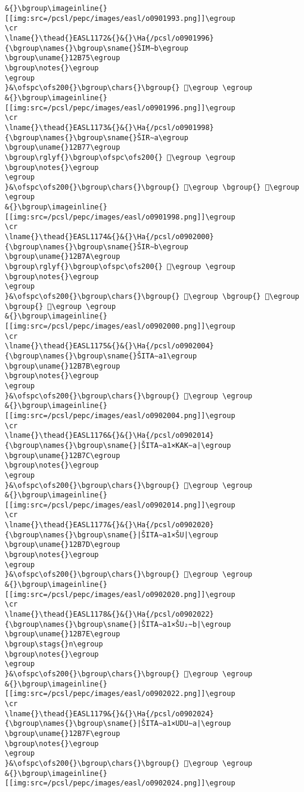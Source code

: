 \begin{verbatim}
&{}\bgroup\imageinline{}[[img:src=/pcsl/pepc/images/easl/o0901993.png]]\egroup
\cr
\lname{}\thead{}EASL1172&{}&{}\Ha{/pcsl/o0901996}{\bgroup\names{}\bgroup\sname{}ŠIM∼b\egroup
\bgroup\uname{}12B75\egroup
\bgroup\notes{}\egroup
\egroup
}&\ofspc\ofs200{}\bgroup\chars{}\bgroup{} 𒭵\egroup \egroup
&{}\bgroup\imageinline{}[[img:src=/pcsl/pepc/images/easl/o0901996.png]]\egroup
\cr
\lname{}\thead{}EASL1173&{}&{}\Ha{/pcsl/o0901998}{\bgroup\names{}\bgroup\sname{}ŠIR∼a\egroup
\bgroup\uname{}12B77\egroup
\bgroup\rglyf{}\bgroup\ofspc\ofs200{} 𒭷\egroup \egroup
\bgroup\notes{}\egroup
\egroup
}&\ofspc\ofs200{}\bgroup\chars{}\bgroup{} 𒭶\egroup \bgroup{} 𒭷\egroup \egroup
&{}\bgroup\imageinline{}[[img:src=/pcsl/pepc/images/easl/o0901998.png]]\egroup
\cr
\lname{}\thead{}EASL1174&{}&{}\Ha{/pcsl/o0902000}{\bgroup\names{}\bgroup\sname{}ŠIR∼b\egroup
\bgroup\uname{}12B7A\egroup
\bgroup\rglyf{}\bgroup\ofspc\ofs200{} 𒭺\egroup \egroup
\bgroup\notes{}\egroup
\egroup
}&\ofspc\ofs200{}\bgroup\chars{}\bgroup{} 𒭸\egroup \bgroup{} 𒭹\egroup \bgroup{} 𒭺\egroup \egroup
&{}\bgroup\imageinline{}[[img:src=/pcsl/pepc/images/easl/o0902000.png]]\egroup
\cr
\lname{}\thead{}EASL1175&{}&{}\Ha{/pcsl/o0902004}{\bgroup\names{}\bgroup\sname{}ŠITA∼a1\egroup
\bgroup\uname{}12B7B\egroup
\bgroup\notes{}\egroup
\egroup
}&\ofspc\ofs200{}\bgroup\chars{}\bgroup{} 𒭻\egroup \egroup
&{}\bgroup\imageinline{}[[img:src=/pcsl/pepc/images/easl/o0902004.png]]\egroup
\cr
\lname{}\thead{}EASL1176&{}&{}\Ha{/pcsl/o0902014}{\bgroup\names{}\bgroup\sname{}|ŠITA∼a1×KAK∼a|\egroup
\bgroup\uname{}12B7C\egroup
\bgroup\notes{}\egroup
\egroup
}&\ofspc\ofs200{}\bgroup\chars{}\bgroup{} 𒭼\egroup \egroup
&{}\bgroup\imageinline{}[[img:src=/pcsl/pepc/images/easl/o0902014.png]]\egroup
\cr
\lname{}\thead{}EASL1177&{}&{}\Ha{/pcsl/o0902020}{\bgroup\names{}\bgroup\sname{}|ŠITA∼a1×ŠU|\egroup
\bgroup\uname{}12B7D\egroup
\bgroup\notes{}\egroup
\egroup
}&\ofspc\ofs200{}\bgroup\chars{}\bgroup{} 𒭽\egroup \egroup
&{}\bgroup\imageinline{}[[img:src=/pcsl/pepc/images/easl/o0902020.png]]\egroup
\cr
\lname{}\thead{}EASL1178&{}&{}\Ha{/pcsl/o0902022}{\bgroup\names{}\bgroup\sname{}|ŠITA∼a1×ŠU₂∼b|\egroup
\bgroup\uname{}12B7E\egroup
\bgroup\stags{}n\egroup
\bgroup\notes{}\egroup
\egroup
}&\ofspc\ofs200{}\bgroup\chars{}\bgroup{} 𒭾\egroup \egroup
&{}\bgroup\imageinline{}[[img:src=/pcsl/pepc/images/easl/o0902022.png]]\egroup
\cr
\lname{}\thead{}EASL1179&{}&{}\Ha{/pcsl/o0902024}{\bgroup\names{}\bgroup\sname{}|ŠITA∼a1×UDU∼a|\egroup
\bgroup\uname{}12B7F\egroup
\bgroup\notes{}\egroup
\egroup
}&\ofspc\ofs200{}\bgroup\chars{}\bgroup{} 𒭿\egroup \egroup
&{}\bgroup\imageinline{}[[img:src=/pcsl/pepc/images/easl/o0902024.png]]\egroup

\end{verbatim}
